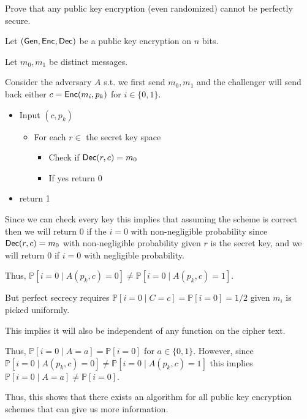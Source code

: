 \documentclass[12pt, letterpaper]{article}
\renewcommand{\P}{\mathbb{P}}
\newcommand{\skcgen}{{\sf Gen}}
\newcommand{\skcenc}{{\sf Enc}}
\newcommand{\skcdec}{{\sf Dec}}
\newcommand{\bit}{{\{0,1\}}}
\begin{document}
\color{\TextColor}
\pagecolor{\colormode}
\setlength{\parindent}{0pt}
\pagestyle{fancy}
\fancyhf{}


\begin{problem}{}
    Prove that any public key encryption (even randomized) cannot be perfectly secure. 
\end{problem}
\begin{problemproof}
    Let $(\skcgen, \skcenc, \skcdec)$ be a public key encryption on $n$ bits.
    
    Let $m_0,m_1$ be distinct messages.

    Consider the adversary $A$ s.t. we first send $m_0,m_1$ and the challenger will send back either $c=\skcenc(m_i,p_k)$ for $i \in \bit$.
    \begin{itemize}
        \item Input $(c,p_k)$
        \begin{itemize}
            \item For each $r \in$ the secret key space
            \begin{itemize}
                \item Check if $\skcdec(r,c) = m_0$
                \item If yes return 0
            \end{itemize}
        \end{itemize}
        \item return 1
    \end{itemize}
    Since we can check every key this implies that assuming the scheme is correct then we will return 0 if the $i=0$ with non-negligible probability since $\skcdec(r,c)=m_0$ with non-negligible probability given $r$ is the secret key, and
    we will return 0 if $i=0$ with negligible probability.

    Thus, $\P[i = 0 \mid A(p_k,c)=0] \neq \P[i=0 \mid A(p_k,c)=1]$.

    But perfect secrecy requires $\P[i=0 \mid C =c] = \P[i=0] = 1/2$ given $m_i$ is picked uniformly.

    This implies it will also be independent of any function on the cipher text.

    Thus, $\P[i=0 \mid A = a] = \P[i=0]$ for $a \in \bit$. However, since $\P[i = 0 \mid A(p_k,c)=0] \neq \P[i=0 \mid A(p_k,c)=1]$ this implies $\P[i=0 \mid A=a] \neq \P[i=0]$.

    Thus, this shows that there exists an algorithm for all public key encryption schemes that can give us more information.
\end{problemproof}
\end{document}
